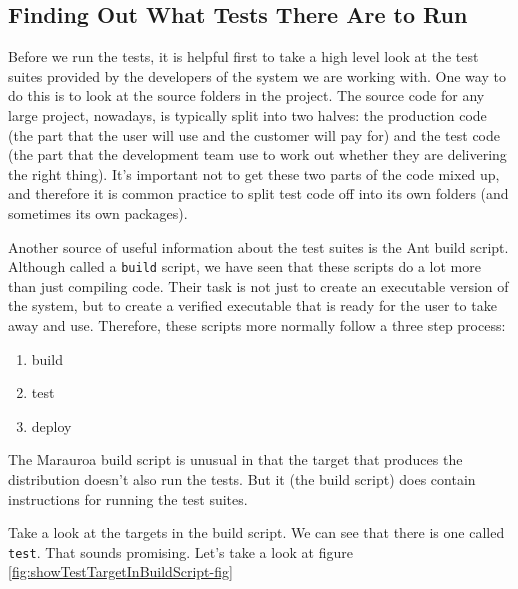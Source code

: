 \documentclass[
]{book}
\providecommand{\tightlist}{%
  \setlength{\itemsep}{0pt}\setlength{\parskip}{0pt}}
\begin{document}
\hypertarget{finding-out-what-tests-there-are-to-run}{%
\subsection{Finding Out What Tests There Are to Run}\label{finding-out-what-tests-there-are-to-run}}

Before we run the tests, it is helpful first to take a high level look at the test suites provided by the developers of the system we are working with. One way to do this is to look at the source folders in the project. The source code for any large project, nowadays, is typically split into two halves: the production code (the part that the user will use and the customer will pay for) and the test code (the part that the development team use to work out whether they are delivering the right thing). It's important not to get these two parts of the code mixed up, and therefore it is common practice to split test code off into its own folders (and sometimes its own packages).

Another source of useful information about the test suites is the Ant build script. Although called a \texttt{build} script, we have seen that these scripts do a lot more than just compiling code. Their task is not just to create an executable version of the system, but to create a verified executable that is ready for the user to take away and use. Therefore, these scripts more normally follow a three step process:

\begin{enumerate}
\def\labelenumi{\arabic{enumi}.}
\tightlist
\item
  build
\item
  test
\item
  deploy
\end{enumerate}

The Marauroa build script is unusual in that the target that produces the distribution doesn't also run the tests. But it (the build script) does contain instructions for running the test suites.

Take a look at the targets in the build script. We can see that there is one called \texttt{test}. That sounds promising. Let's take a look at figure \ref{fig:showTestTargetInBuildScript-fig}
\end{document}
